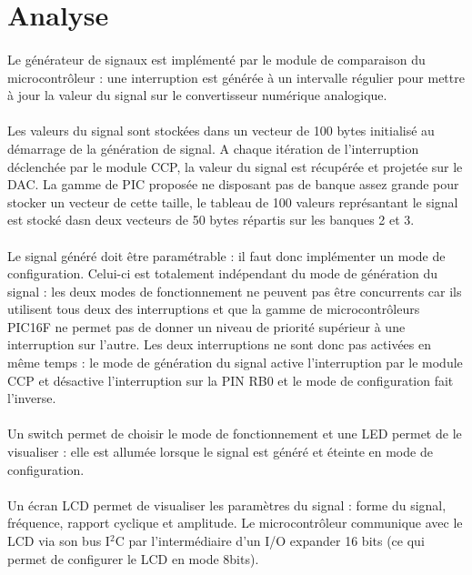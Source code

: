 \documentclass{article}
\begin{document}
    \newpage
    \section{Analyse}
    \paragraph{}
    Le générateur de signaux est implémenté par le module de comparaison du microcontrôleur : une interruption est générée à un intervalle régulier pour mettre à jour la valeur du signal sur le convertisseur numérique analogique.

    \paragraph{}
    Les valeurs du signal sont stockées dans un vecteur de 100 bytes initialisé au démarrage de la génération de signal. A chaque itération de l'interruption déclenchée par le module CCP, la valeur du signal est récupérée et projetée sur le DAC. La gamme de PIC proposée ne disposant pas de banque assez grande pour stocker un vecteur de cette taille, le tableau de 100 valeurs représantant le signal est stocké dasn deux vecteurs de 50 bytes répartis sur les banques 2 et 3.

    \paragraph{}
    Le signal généré doit être paramétrable : il faut donc implémenter un mode de configuration. Celui-ci est totalement indépendant du mode de génération du signal : les deux modes de fonctionnement ne peuvent pas être concurrents car ils utilisent tous deux des interruptions et que la gamme de microcontrôleurs PIC16F ne permet pas de donner un niveau de priorité supérieur à une interruption sur l'autre. Les deux interruptions ne sont donc pas activées en même temps : le mode de génération du signal active l'interruption par le module CCP et désactive l'interruption sur la PIN RB0 et le mode de configuration fait l'inverse.
    
    \paragraph{}
    Un switch permet de choisir le mode de fonctionnement et une LED permet de le visualiser : elle est allumée lorsque le signal est généré et éteinte en mode de configuration.

    \paragraph{}
    Un écran LCD permet de visualiser les paramètres du signal : forme du signal, fréquence, rapport cyclique et amplitude. Le microcontrôleur communique avec le LCD via son bus I$^2$C par l'intermédiaire d'un I/O expander 16 bits (ce qui permet de configurer le LCD en mode 8bits).
\end{document}
